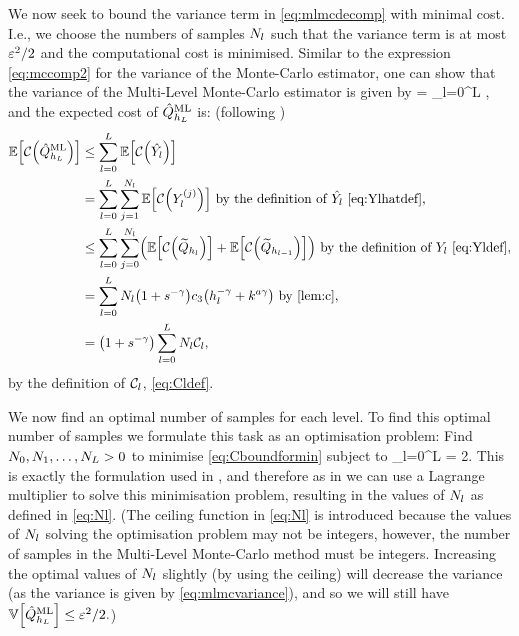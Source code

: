 We now seek to bound the variance term in \cref{eq:mlmcdecomp} with minimal cost. I.e., we choose the numbers of samples $N_{l}$ such that the variance term is at most $\varepsilon^2/2$ and the computational cost is minimised. Similar to the expression \cref{eq:mccomp2} for the variance of the Monte-Carlo estimator, one can show that the variance of the Multi-Level Monte-Carlo estimator is given by
\beq\label{eq:mlmcvariance}
\VAR{\QhatMLhL} = \sum_{l=0}^L \frac{\Vl}{\Nl},
\eeq
and the expected cost of $\hat{Q}^{\mathrm{ML}}_{h_{L}}$ is: (following \cite{GrPaSc:19})
\begin{align}
\EXP{\Cost{\QhatMLhL}}&\leq \sum_{l=0}^L \EXP{\Cost{\Ylhat}}\nonumber\\
&= \sum_{l=0}^L \sum_{j=1}^{\Nl} \EXP{\Cost{\Ylj}}\text{ by the definition of } \Ylhat \text{ \cref{eq:Ylhatdef},}\nonumber\\
&\leq \sum_{l=0}^L \sum_{j=0}^{\Nl} \mleft(\EXP{\Cost{\Qhltilde}} + \EXP{\Cost{\Qhlmotilde}}\mright)\text{ by the definition of }\Yl \text{ \cref{eq:Yldef},}\nonumber\\
&=\sum_{l=0}^L \Nl\mleft(1+s^{-\gamma}\mright) \cth \mleft(\hl^{-\gamma}+k^{a\gamma}\mright) \text{ by \cref{lem:c},}\nonumber\\
&= \mleft(1+s^{-\gamma}\mright) \sum_{l=0}^L \Nl\Cl,\label{eq:Cboundformin}
\end{align}
by the definition of $\mathcal C_{l}$, \cref{eq:Cldef}.

We now find an optimal number of samples for each level. To find this optimal number of samples we formulate this task as an optimisation problem:
Find $N_{0},N_{1},\ldots,N_{L} > 0$ to minimise \cref{eq:Cboundformin} subject to
\beqs
\sum_{l=0}^L \frac{\Vl}{\Nl} = 2.
\eeqs
This is exactly the formulation used in \cite[Section 1.3]{Gi:15}, and therefore as in \cite[Section 1.3]{Gi:15} we can use a Lagrange multiplier to solve this minimisation problem, resulting in the values of $N_{l}$ as defined in \cref{eq:Nl}. (The ceiling function in \cref{eq:Nl} is introduced because the values of $N_{l}$ solving the optimisation problem may not be integers, however, the number of samples in the Multi-Level Monte-Carlo method must be integers. Increasing the optimal values of $N_{l}$ slightly (by using the ceiling) will decrease the variance (as the variance is given by \cref{eq:mlmcvariance}), and so we will still have $\VAR{\QhatMLhL} \leq \eps^2/2.$)

